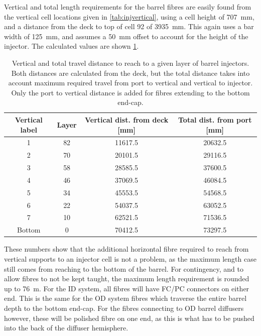 \documentclass[a4paper,11pt]{article}
\begin{document}
Vertical and total length requirements for the barrel fibres are easily found from the vertical cell locations given in \cref{tab:injvertical}, using a cell height of 707~mm, and a distance from the deck to top of cell 92 of 3935~mm. This again uses a bar width of 125~mm, and assumes a 50~mm offset to account for the height of the injector. The calculated values are shown \cref{tab:barrelLength}.
\begin{table}[h!]
\centering
\begin{tabular}{cccc}\toprule
Vertical label	&	Layer	&	Vertical dist. from deck [mm]	&	Total dist. from port [mm]	\\	\midrule
	1			&	82		&	11617.5							&	20632.5	\\
	2			&	70		&	20101.5							&	29116.5	\\	
	3			&	58		&	28585.5							&	37600.5	\\
	4			&	46		&	37069.5							&	46084.5	\\
	5			&	34		&	45553.5							&	54568.5	\\
	6			&	22		&	54037.5							&	63052.5	\\
	7			&	10		&	62521.5							&	71536.5	\\
	Bottom		&	0		&	70412.5							&	73297.5	\\ \bottomrule
\end{tabular}
\caption{Vertical and total travel distance to reach to a given layer of barrel injectors. Both distances are calculated from the deck, but the total distance takes into account maximum required travel from port to vertical and vertical to injector. Only the port to vertical distance is added for fibres extending to the bottom end-cap.}\label{tab:barrelLength}
\end{table}
These numbers show that the additional horizontal fibre required to reach from vertical supports to an injector cell is not a problem, as the maximum length case still comes from reaching to the bottom of the barrel. For contingency, and to allow fibres to not be kept taught, the maximum length requirement is rounded up to 76~m. For the ID system, all fibres will have FC/PC connectors on either end. This is the same for the OD system fibres which traverse the entire barrel depth to the bottom end-cap. For the fibres connecting to OD barrel diffusers however, these will be polished fibre on one end, as this is what has to be pushed into the back of the diffuser hemisphere.
\end{document}
